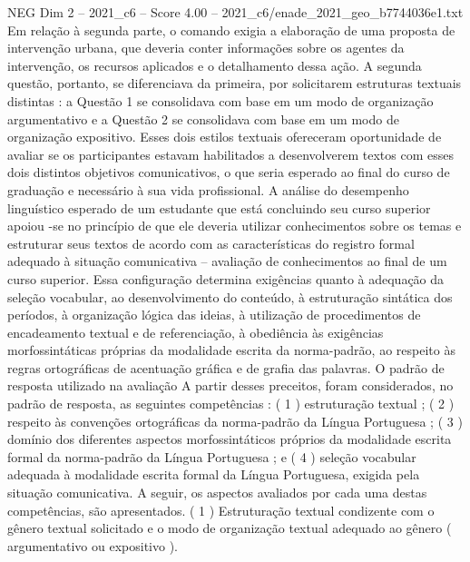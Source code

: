 \begin{textsample}{NEG Dim 2 – 2021\_c6 – Score 4.00 – 2021\_c6/enade\_2021\_geo\_b7744036e1.txt}
Em relação à segunda parte, o comando exigia a elaboração de uma proposta de intervenção urbana, que deveria conter informações sobre os agentes da intervenção, os recursos aplicados e o detalhamento dessa ação.
A segunda questão, portanto, se diferenciava da primeira, por solicitarem estruturas textuais distintas : a Questão 1 se consolidava com base em um modo de organização argumentativo e a Questão 2 se consolidava com base em um modo de organização expositivo.
Esses dois estilos textuais ofereceram oportunidade de avaliar se os participantes estavam habilitados a desenvolverem textos com esses dois distintos objetivos comunicativos, o que seria esperado ao final do curso de graduação e necessário à sua vida profissional.
A análise do desempenho linguístico esperado de um estudante que está concluindo seu curso superior apoiou -se no princípio de que ele deveria utilizar conhecimentos sobre os temas e estruturar seus textos de acordo com as características do registro formal adequado à situação comunicativa – avaliação de conhecimentos ao final de um curso superior.
Essa configuração determina exigências quanto à adequação da seleção vocabular, ao desenvolvimento do conteúdo, à estruturação sintática dos períodos, à organização lógica das ideias, à utilização de procedimentos de encadeamento textual e de referenciação, à obediência às exigências morfossintáticas próprias da modalidade escrita da norma-padrão, ao respeito às regras ortográficas de acentuação gráfica e de grafia das palavras.
O padrão de resposta utilizado na avaliação A partir desses preceitos, foram considerados, no padrão de resposta, as seguintes competências : ( 1 ) estruturação textual ; ( 2 ) respeito às convenções ortográficas da norma-padrão da Língua Portuguesa ; ( 3 ) domínio dos diferentes aspectos morfossintáticos próprios da modalidade escrita formal da norma-padrão da Língua Portuguesa ; e ( 4 ) seleção vocabular adequada à modalidade escrita formal da Língua Portuguesa, exigida pela situação comunicativa.
A seguir, os aspectos avaliados por cada uma destas competências, são apresentados. ( 1 ) Estruturação textual condizente com o gênero textual solicitado e o modo de organização textual adequado ao gênero ( argumentativo ou expositivo ).

\end{textsample}
